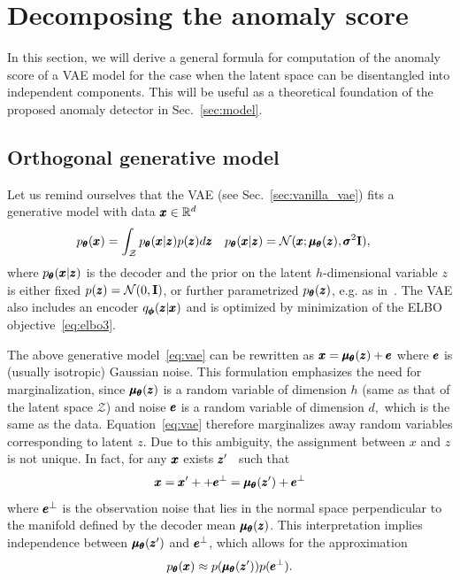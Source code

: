 \section{Decomposing the anomaly score} 
\label{sec:theory}
In this section, we will derive a general formula for computation of the anomaly score of a VAE model for the case when the latent space can be disentangled into independent components. This will be useful as a theoretical foundation of the proposed anomaly detector in Sec.~\ref{sec:model}.

\subsection{Orthogonal generative model} \label{sec:orthogonal_score}
Let us remind ourselves that the VAE (see Sec.~\ref{sec:vanilla_vae}) fits a generative model with data $\pmb{{x}} \in \mathbb{R}^d$
\begin{align}
p_{\pmb{{\theta}}}(\pmb{{x}}) & = \int_{\mathcal{Z}} p_{\pmb{{\theta}}}(\pmb{{x}} \vert \pmb{{z}})p(\pmb{{z}})d\pmb{{z}} & p_{\pmb{{\theta}}}(\pmb{{x}} \vert \pmb{{z}}) & =\mathcal{N}(\pmb{{x}};\pmb{{\mu}}_{\pmb{{\theta}}}(\pmb{{z}}),\pmb{{\sigma}}^{2} \mathbf{I}),\label{eq:vae}
\end{align}
where $p_{\pmb{{\theta}}}(\pmb{{x}}\vert \pmb{{z}})$ is the decoder and the prior on the latent $h$-dimensional variable $z$ is either fixed $p(\pmb{{z}})=\mathcal{N}(0,\mathbf{I})$, or further parametrized $p_{\pmb{{\theta}}}(\pmb{{z}})$, e.g. as in~\cite{tomczak2017vae}. The VAE also includes an encoder $q_{\pmb{{\phi}}}(\pmb{{z}}\vert \pmb{{x}})$ and is optimized by minimization of the ELBO objective~\eqref{eq:elbo3}. 

The above generative model~\eqref{eq:vae} can be rewritten as $\pmb{{x}}=\pmb{{\mu}}_{\pmb{{\theta}}}(\pmb{{z}})+\pmb{{e}}$ where $\pmb{{e}}$ is (usually isotropic) Gaussian noise. This formulation emphasizes the need for marginalization, since $\pmb{{\mu}}_{\pmb{{\theta}}}(\pmb{{z}})$ is a random variable of dimension $h$ (same as that of the latent space $\mathcal{Z}$) and noise $\pmb{{e}}$ is a random variable of dimension $d,$ which is the same as the data. Equation~\eqref{eq:vae} therefore marginalizes away random variables corresponding to latent $z.$ Due to this ambiguity, the assignment between $x$ and $z$ is not unique. In fact, for any $\pmb{{x}}$ exists  $\pmb{{z}}'$~\cite{pidhorskyi2018generative, vsmidl2019anomaly} such that \[
\pmb{{x}}=\pmb{{x}}' + +\pmb{{e}}^{\bot} = \pmb{{\mu}}_{\pmb{{\theta}}}(\pmb{{z}}')+\pmb{{e}}^{\bot}
\]
where $\pmb{{e}}^{\bot}$ is the observation noise that lies in the normal space perpendicular to the manifold defined by the decoder mean $\pmb{{\mu}}_{\pmb{{\theta}}}(\pmb{{z}})$. This interpretation implies independence between $\pmb{{\mu}}_{\pmb{{\theta}}}(\pmb{{z}}')$ and $\pmb{{e}}^\bot$, which allows for the approximation 
\begin{equation}
p_{\pmb{{\theta}}}(\pmb{{x}})\approx p(\pmb{{\mu}}_{\pmb{{\theta}}}(\pmb{{z}}'))p(\pmb{{e}}^{\bot}). 
\end{equation}

